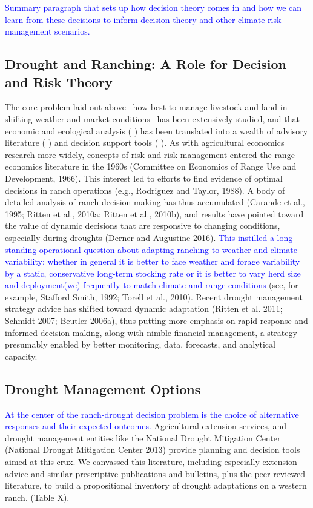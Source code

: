 \documentclass[11pt]{article}
\begin{document}
\textcolor{blue}{Summary paragraph that sets up how decision theory comes in and how we can learn from these decisions to inform decision theory and other climate risk management scenarios.}

\subsection{Drought and Ranching: A Role for Decision and Risk Theory}
The core problem laid out above-- how best to manage livestock and land in shifting weather and market conditions-- has been extensively studied, and that economic and ecological analysis (    ) has been translated into a wealth of advisory literature (        ) and decision support tools (      ).  As with agricultural economics research more widely, concepts of risk and risk management entered the range economics literature in the 1960s (Committee on Economics of Range Use and Development, 1966). This interest led to efforts to find evidence of optimal decisions in ranch operations (e.g., Rodriguez and Taylor, 1988). A body of detailed analysis of ranch decision-making has thus accumulated (Carande et al., 1995; Ritten et al., 2010a; Ritten et al., 2010b), and results have pointed toward the value of dynamic decisions that are responsive to changing conditions, especially during droughts (Derner and Augustine 2016). \textcolor{blue}{This instilled a long-standing operational question about adapting ranching to weather and climate variability: whether in general it is better to face weather and forage variability by a static, conservative long-term stocking rate or it is better to vary herd size and deployment(wc) frequently to match climate and range conditions} (see, for example, Stafford Smith, 1992; Torell et al., 2010). Recent drought management strategy advice has shifted toward dynamic adaptation (Ritten et al. 2011; Schmidt 2007; Beutler 2006a), thus putting more emphasis on rapid response and informed decision-making, along with nimble financial management, a strategy presumably enabled by better monitoring, data, forecasts, and analytical capacity. 



\subsection{Drought Management Options}
\textcolor{blue}{At the center of the ranch-drought decision problem is the choice of alternative responses and their expected outcomes.} Agricultural extension services, and drought management entities like the National Drought Mitigation Center (National Drought Mitigation Center 2013) provide planning and decision tools aimed at this crux. We canvassed this literature, including especially extension advice and similar prescriptive publications and bulletins, plus the peer-reviewed literature, to build a propositional inventory of drought adaptations on a western ranch. (Table X). 
\end{document}
